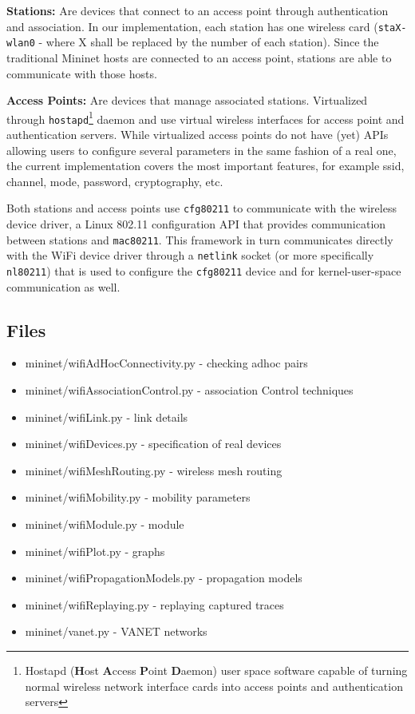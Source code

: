\noindent \textbf{Stations:} Are devices that connect to an access point through authentication and association. In our implementation, each station has one wireless card (\texttt{staX-wlan0} - where X shall be replaced by the number of each station). Since the traditional Mininet hosts are connected to an access point, stations are able to communicate with those hosts.

\noindent \textbf{Access Points:} Are devices that manage associated stations. Virtualized through \texttt{hostapd}\footnote{Hostapd (\textbf{H}ost \textbf{A}ccess \textbf{P}oint \textbf{D}aemon) user space software capable of turning normal wireless network interface cards into access points and authentication servers} daemon and use virtual wireless interfaces for access point and authentication servers. 
While virtualized access points do not have (yet) APIs allowing users to configure several parameters in the same fashion of a real one, the current implementation covers the most important features, for example ssid, channel, mode, password, cryptography, etc.

Both stations and access points use \texttt{cfg80211} to communicate with the wireless device driver, a Linux 802.11 configuration API that provides communication between stations and \texttt{mac80211}. This framework in turn communicates directly with the WiFi device driver through a \texttt{netlink} socket (or more specifically \texttt{nl80211}) that is used to configure the \texttt{cfg80211} device and for kernel-user-space communication as well.

\subsection{Files}

\begin{itemize}
\item mininet/wifiAdHocConnectivity.py - checking adhoc pairs
\item mininet/wifiAssociationControl.py - association Control techniques
\item mininet/wifiLink.py - link details
\item mininet/wifiDevices.py - specification of real devices
\item mininet/wifiMeshRouting.py - wireless mesh routing
\item mininet/wifiMobility.py - mobility parameters
\item mininet/wifiModule.py - module 
\item mininet/wifiPlot.py - graphs
\item mininet/wifiPropagationModels.py - propagation models
\item mininet/wifiReplaying.py - replaying captured traces
\item mininet/vanet.py - VANET networks
\end{itemize}

